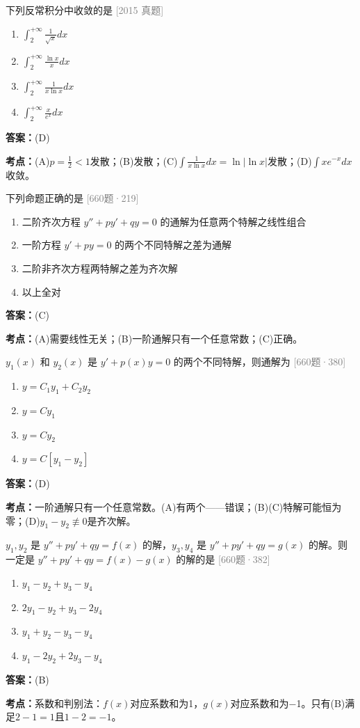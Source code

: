\documentclass[12pt,a4paper]{ctexbook}
\newcommand{\src}[1]{\hfill\textcolor{gray}{\small\textsf{[#1]}}}
\newcommand{\ans}[1]{\begin{answerbox}\textbf{答案：}#1\end{answerbox}}
\newcommand{\kpt}[1]{\textbf{考点：}#1}
\begin{document}
\bigskip

\begin{exercise}
下列反常积分中收敛的是 \hfill\src{2015 真题}
\begin{enumerate}[label=(\Alph*),nosep]
  \item $\int_2^{+\infty}\frac{1}{\sqrt{x}}dx$
  \item $\int_2^{+\infty}\frac{\ln x}{x}dx$
  \item $\int_2^{+\infty}\frac{1}{x\ln x}dx$
  \item $\int_2^{+\infty}\frac{x}{e^{x}}dx$
\end{enumerate}
\end{exercise}
\ans{(D)}
\kpt{(A)$p=\frac{1}{2}<1$发散；(B)发散；(C)$\int\frac{1}{x\ln x}dx=\ln|\ln x|$发散；(D)$\int xe^{-x}dx$收敛。}

\bigskip

\begin{exercise}[660题·微分方程解的结构·219]
下列命题正确的是 \hfill\src{660题·219}
\begin{enumerate}[label=(\Alph*),nosep]
  \item 二阶齐次方程 $y''+py'+qy=0$ 的通解为任意两个特解之线性组合
  \item 一阶方程 $y'+py=0$ 的两个不同特解之差为通解
  \item 二阶非齐次方程两特解之差为齐次解
  \item 以上全对
\end{enumerate}
\end{exercise}
\ans{(C)}
\kpt{(A)需要线性无关；(B)一阶通解只有一个任意常数；(C)正确。}

\bigskip

\begin{exercise}[660题·一阶齐次通解·380]
$y_1(x)$ 和 $y_2(x)$ 是 $y'+p(x)y=0$ 的两个不同特解，则通解为 \hfill\src{660题·380}
\begin{enumerate}[label=(\Alph*),nosep]
  \item $y=C_1y_1+C_2y_2$
  \item $y=C y_1$
  \item $y=C y_2$
  \item $y=C[y_1-y_2]$
\end{enumerate}
\end{exercise}
\ans{(D)}
\kpt{一阶通解只有一个任意常数。(A)有两个——错误；(B)(C)特解可能恒为零；(D)$y_1-y_2\not\equiv 0$是齐次解。}

\bigskip

\begin{exercise}[660题·解的叠加原理·382]
$y_1,y_2$ 是 $y''+py'+qy=f(x)$ 的解，$y_3,y_4$ 是 $y''+py'+qy=g(x)$ 的解。则一定是 $y''+py'+qy=f(x)-g(x)$ 的解的是 \hfill\src{660题·382}
\begin{enumerate}[label=(\Alph*),nosep]
  \item $y_1-y_2+y_3-y_4$
  \item $2y_1-y_2+y_3-2y_4$
  \item $y_1+y_2-y_3-y_4$
  \item $y_1-2y_2+2y_3-y_4$
\end{enumerate}
\end{exercise}
\ans{(B)}
\kpt{系数和判别法：$f(x)$对应系数和为1，$g(x)$对应系数和为$-$1。只有(B)满足$2-1=1$且$1-2=-1$。}
\end{document}
